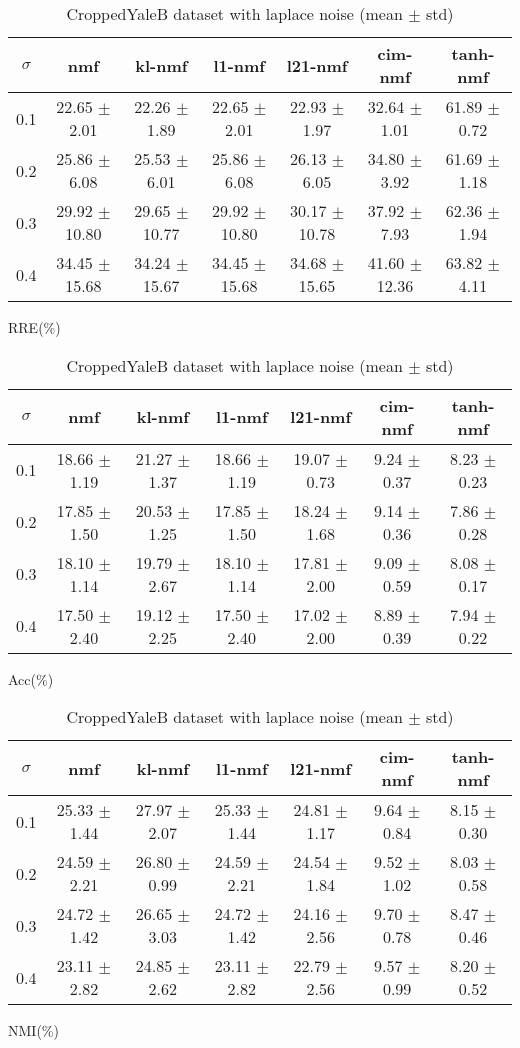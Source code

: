 \documentclass{article} %
\begin{document}
\begin{table}
\begin{subtable}{\linewidth}
\begin{tabular}{c|cccccc}$\sigma$ & nmf & kl-nmf & l1-nmf & l21-nmf & cim-nmf & tanh-nmf \\\hline
0.1 & 22.65 $\pm$ 2.01 & 22.26 $\pm$ 1.89 & 22.65 $\pm$ 2.01 & 22.93 $\pm$ 1.97 & 32.64 $\pm$ 1.01 & 61.89 $\pm$ 0.72 \\
0.2 & 25.86 $\pm$ 6.08 & 25.53 $\pm$ 6.01 & 25.86 $\pm$ 6.08 & 26.13 $\pm$ 6.05 & 34.80 $\pm$ 3.92 & 61.69 $\pm$ 1.18 \\
0.3 & 29.92 $\pm$ 10.80 & 29.65 $\pm$ 10.77 & 29.92 $\pm$ 10.80 & 30.17 $\pm$ 10.78 & 37.92 $\pm$ 7.93 & 62.36 $\pm$ 1.94 \\
0.4 & 34.45 $\pm$ 15.68 & 34.24 $\pm$ 15.67 & 34.45 $\pm$ 15.68 & 34.68 $\pm$ 15.65 & 41.60 $\pm$ 12.36 & 63.82 $\pm$ 4.11 \\
\end{tabular}\caption{RRE(\%)}\end{subtable}
\begin{subtable}{\linewidth}
\begin{tabular}{c|cccccc}$\sigma$ & nmf & kl-nmf & l1-nmf & l21-nmf & cim-nmf & tanh-nmf \\\hline
0.1 & 18.66 $\pm$ 1.19 & 21.27 $\pm$ 1.37 & 18.66 $\pm$ 1.19 & 19.07 $\pm$ 0.73 & 9.24 $\pm$ 0.37 & 8.23 $\pm$ 0.23 \\
0.2 & 17.85 $\pm$ 1.50 & 20.53 $\pm$ 1.25 & 17.85 $\pm$ 1.50 & 18.24 $\pm$ 1.68 & 9.14 $\pm$ 0.36 & 7.86 $\pm$ 0.28 \\
0.3 & 18.10 $\pm$ 1.14 & 19.79 $\pm$ 2.67 & 18.10 $\pm$ 1.14 & 17.81 $\pm$ 2.00 & 9.09 $\pm$ 0.59 & 8.08 $\pm$ 0.17 \\
0.4 & 17.50 $\pm$ 2.40 & 19.12 $\pm$ 2.25 & 17.50 $\pm$ 2.40 & 17.02 $\pm$ 2.00 & 8.89 $\pm$ 0.39 & 7.94 $\pm$ 0.22 \\
\end{tabular}\caption{Acc(\%)}\end{subtable}
\begin{subtable}{\linewidth}
\begin{tabular}{c|cccccc}$\sigma$ & nmf & kl-nmf & l1-nmf & l21-nmf & cim-nmf & tanh-nmf \\\hline
0.1 & 25.33 $\pm$ 1.44 & 27.97 $\pm$ 2.07 & 25.33 $\pm$ 1.44 & 24.81 $\pm$ 1.17 & 9.64 $\pm$ 0.84 & 8.15 $\pm$ 0.30 \\
0.2 & 24.59 $\pm$ 2.21 & 26.80 $\pm$ 0.99 & 24.59 $\pm$ 2.21 & 24.54 $\pm$ 1.84 & 9.52 $\pm$ 1.02 & 8.03 $\pm$ 0.58 \\
0.3 & 24.72 $\pm$ 1.42 & 26.65 $\pm$ 3.03 & 24.72 $\pm$ 1.42 & 24.16 $\pm$ 2.56 & 9.70 $\pm$ 0.78 & 8.47 $\pm$ 0.46 \\
0.4 & 23.11 $\pm$ 2.82 & 24.85 $\pm$ 2.62 & 23.11 $\pm$ 2.82 & 22.79 $\pm$ 2.56 & 9.57 $\pm$ 0.99 & 8.20 $\pm$ 0.52 \\
\end{tabular}\caption{NMI(\%)}\end{subtable}
\caption{CroppedYaleB dataset with laplace noise (mean $\pm$ std)}
\end{table}
\end{document}
